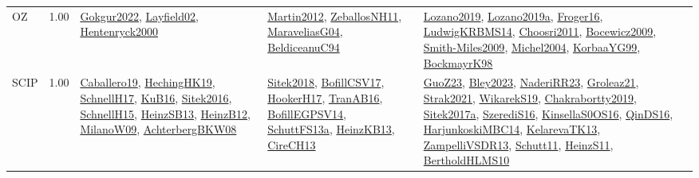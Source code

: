 {\begin{longtable}{p{3cm}r>{\raggedright\arraybackslash}p{6cm}>{\raggedright\arraybackslash}p{6cm}>{\raggedright\arraybackslash}p{8cm}}
\index{OZ}\index{CPSystems!OZ}OZ &  1.00 & \hyperref[detail:Gokgur2022]{Gokgur2022}, \hyperref[detail:Layfield02]{Layfield02}, \hyperref[detail:Hentenryck2000]{Hentenryck2000} & \hyperref[detail:Martin2012]{Martin2012}, \hyperref[detail:ZeballosNH11]{ZeballosNH11}, \hyperref[detail:MaraveliasG04]{MaraveliasG04}, \hyperref[detail:BeldiceanuC94]{BeldiceanuC94} & \hyperref[detail:Lozano2019]{Lozano2019}, \hyperref[detail:Lozano2019a]{Lozano2019a}, \hyperref[detail:Froger16]{Froger16}, \hyperref[detail:LudwigKRBMS14]{LudwigKRBMS14}, \hyperref[detail:Choosri2011]{Choosri2011}, \hyperref[detail:Bocewicz2009]{Bocewicz2009}, \hyperref[detail:Smith-Miles2009]{Smith-Miles2009}, \hyperref[detail:Michel2004]{Michel2004}, \hyperref[detail:KorbaaYG99]{KorbaaYG99}, \hyperref[detail:BockmayrK98]{BockmayrK98}\\
\index{SCIP}\index{CPSystems!SCIP}SCIP &  1.00 & \hyperref[detail:Caballero19]{Caballero19}, \hyperref[detail:HechingHK19]{HechingHK19}, \hyperref[detail:SchnellH17]{SchnellH17}, \hyperref[detail:KuB16]{KuB16}, \hyperref[detail:Sitek2016]{Sitek2016}, \hyperref[detail:SchnellH15]{SchnellH15}, \hyperref[detail:HeinzSB13]{HeinzSB13}, \hyperref[detail:HeinzB12]{HeinzB12}, \hyperref[detail:MilanoW09]{MilanoW09}, \hyperref[detail:AchterbergBKW08]{AchterbergBKW08} & \hyperref[detail:Sitek2018]{Sitek2018}, \hyperref[detail:BofillCSV17]{BofillCSV17}, \hyperref[detail:HookerH17]{HookerH17}, \hyperref[detail:TranAB16]{TranAB16}, \hyperref[detail:BofillEGPSV14]{BofillEGPSV14}, \hyperref[detail:SchuttFS13a]{SchuttFS13a}, \hyperref[detail:HeinzKB13]{HeinzKB13}, \hyperref[detail:CireCH13]{CireCH13} & \hyperref[detail:GuoZ23]{GuoZ23}, \hyperref[detail:Bley2023]{Bley2023}, \hyperref[detail:NaderiRR23]{NaderiRR23}, \hyperref[detail:Groleaz21]{Groleaz21}, \hyperref[detail:Strak2021]{Strak2021}, \hyperref[detail:WikarekS19]{WikarekS19}, \hyperref[detail:Chakrabortty2019]{Chakrabortty2019}, \hyperref[detail:Sitek2017a]{Sitek2017a}, \hyperref[detail:SzerediS16]{SzerediS16}, \hyperref[detail:KinsellaS0OS16]{KinsellaS0OS16}, \hyperref[detail:QinDS16]{QinDS16}, \hyperref[detail:HarjunkoskiMBC14]{HarjunkoskiMBC14}, \hyperref[detail:KelarevaTK13]{KelarevaTK13}, \hyperref[detail:ZampelliVSDR13]{ZampelliVSDR13}, \hyperref[detail:Schutt11]{Schutt11}, \hyperref[detail:HeinzS11]{HeinzS11}, \hyperref[detail:BertholdHLMS10]{BertholdHLMS10}\\

\end{longtable}}
